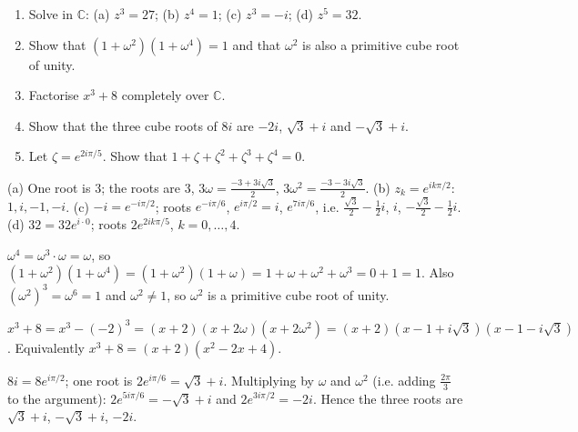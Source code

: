 \documentclass[11pt]{article}
\begin{document}
\begin{exercice}[Practice]
\begin{enumerate}
\item Solve in $\mathbb{C}$: (a) $z^3 = 27$; (b) $z^4 = 1$; (c) $z^3 = -i$; (d) $z^5 = 32$.
\item Show that $(1 + \omega^2)(1 + \omega^4) = 1$ and that $\omega^2$ is also a primitive cube root of unity.
\item Factorise $x^3 + 8$ completely over $\mathbb{C}$.
\item Show that the three cube roots of $8i$ are $-2i$, $\sqrt{3} + i$ and $-\sqrt{3} + i$.
\item Let $\zeta = e^{2i\pi/5}$. Show that $1 + \zeta + \zeta^2 + \zeta^3 + \zeta^4 = 0$.
\end{enumerate}
\end{exercice}

\begin{corrige}[Exercise n°1]
(a) One root is $3$; the roots are $3$, $3\omega = \tfrac{-3 + 3i\sqrt{3}}{2}$, $3\omega^2 = \tfrac{-3 - 3i\sqrt{3}}{2}$.
(b) $z_k = e^{ik\pi/2}$: $1, i, -1, -i$.
(c) $-i = e^{-i\pi/2}$; roots $e^{-i\pi/6}$, $e^{i\pi/2} = i$, $e^{7i\pi/6}$, i.e. $\tfrac{\sqrt{3}}{2} - \tfrac{1}{2}i$, $i$, $-\tfrac{\sqrt{3}}{2} - \tfrac{1}{2}i$.
(d) $32 = 32e^{i \cdot 0}$; roots $2e^{2ik\pi/5}$, $k = 0, \dots, 4$.
\end{corrige}

\begin{corrige}[Exercise n°2]
$\omega^4 = \omega^3 \cdot \omega = \omega$, so $(1+\omega^2)(1+\omega^4) = (1+\omega^2)(1+\omega) = 1 + \omega + \omega^2 + \omega^3 = 0 + 1 = 1$. Also $(\omega^2)^3 = \omega^6 = 1$ and $\omega^2 \neq 1$, so $\omega^2$ is a primitive cube root of unity.
\end{corrige}

\begin{corrige}[Exercise n°3]
$x^3 + 8 = x^3 - (-2)^3 = (x+2)(x + 2\omega)(x + 2\omega^2) = (x+2)(x - 1 + i\sqrt{3})(x - 1 - i\sqrt{3})$. Equivalently $x^3 + 8 = (x+2)(x^2 - 2x + 4)$.
\end{corrige}

\begin{corrige}[Exercise n°4]
$8i = 8e^{i\pi/2}$; one root is $2e^{i\pi/6} = \sqrt{3} + i$. Multiplying by $\omega$ and $\omega^2$ (i.e. adding $\tfrac{2\pi}{3}$ to the argument): $2e^{5i\pi/6} = -\sqrt{3} + i$ and $2e^{3i\pi/2} = -2i$. Hence the three roots are $\sqrt{3}+i$, $-\sqrt{3}+i$, $-2i$.
\end{corrige}
\end{document}
